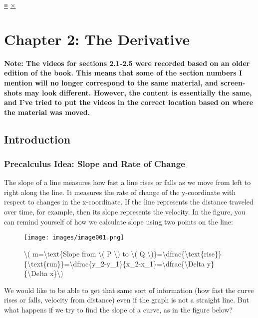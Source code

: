 \protect\hyperlink{main-nav}{≡} \protect\hyperlink{close-nav}{×}

\hypertarget{chapter-2-the-derivative}{%
\section{Chapter 2: The Derivative}\label{chapter-2-the-derivative}}

\textbf{Note: The videos for sections 2.1-2.5 were recorded based on an
older edition of the book. This means that some of the section numbers I
mention will no longer correspond to the same material, and screen-shots
may look different. However, the content is essentially the same, and
I've tried to put the videos in the correct location based on where the
material was moved.}

\hypertarget{introduction}{%
\subsection{Introduction}\label{introduction}}

\hypertarget{precalculus-idea-slope-and-rate-of-change}{%
\subsubsection{Precalculus Idea: Slope and Rate of
Change}\label{precalculus-idea-slope-and-rate-of-change}}

The slope of a line measures how fast a line rises or falls as we move
from left to right along the line. It measures the rate of change of the
y-coordinate with respect to changes in the x-coordinate. If the line
represents the distance traveled over time, for example, then its slope
represents the velocity. In the figure, you can remind yourself of how
we calculate slope using two points on the line:

\begin{figure}
\centering
\texttt{[image: images/image001.png]}
\caption{\textbackslash{}( m=\textbackslash{}text\{Slope from
\textbackslash{}( P \textbackslash{}) to \textbackslash{}( Q
\textbackslash{})\}=\textbackslash{}dfrac\{\textbackslash{}text\{rise\}\}\{\textbackslash{}text\{run\}\}=\textbackslash{}dfrac\{y\_2-y\_1\}\{x\_2-x\_1\}=\textbackslash{}dfrac\{\textbackslash{}Delta
y\}\{\textbackslash{}Delta x\}\textbackslash{})}
\end{figure}

We would like to be able to get that same sort of information (how fast
the curve rises or falls, velocity from distance) even if the graph is
not a straight line. But what happens if we try to find the slope of a
curve, as in the figure below?

